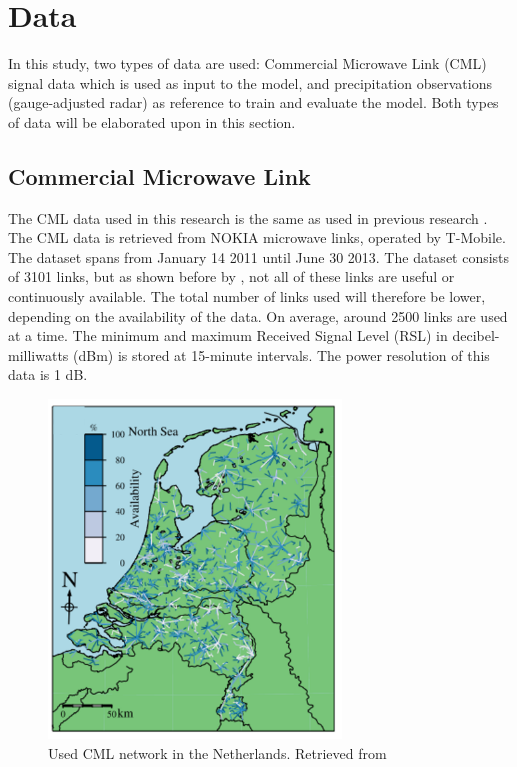 \documentclass[twocolumn, 10pt, a4paper]{memoir}
\begin{document}
	
	
	
	
	
	 
	\cleardoublepage
	\chapter{Data}\vspace{-6mm}\label{ch: field}
	In this study, two types of data are used: Commercial Microwave Link (CML) signal data which is used as input to the model, and precipitation observations (gauge-adjusted radar) as reference to train and evaluate the model. Both types of data will be elaborated upon in this section.
	
	
	\section{Commercial Microwave Link} \label{sec: CML data}
	The CML data used in this research is the same as used in previous research .
	The CML data is retrieved from NOKIA microwave links, operated by T-Mobile. The dataset spans from January 14 2011 until June 30 2013. The dataset consists of  3101 links, but as shown before by , not all of these links are useful or continuously available. The total number of links used will therefore be lower, depending on the availability of the data. On average, around 2500 links are used at a time. The minimum and maximum Received Signal Level (RSL) in decibel-milliwatts (dBm) is stored at 15-minute intervals. The power resolution of this data is 1 dB. 
	
	\begin{figure}[h]
		\includegraphics[height= 9cm]{Dutch_CML_network}
		\caption{Used CML network in the Netherlands. Retrieved from \protect{}}
		\label{fig: cmlnetworkmaps}	
	\end{figure}
\end{document}

